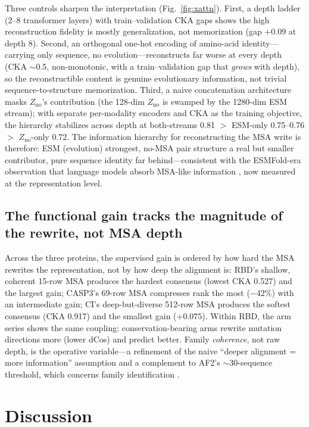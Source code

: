 \documentclass[11pt]{article}
\newcommand{\Zno}{\ensuremath{Z_{\mathrm{no}}}}
\begin{document}
Three controls sharpen the interpretation (Fig.~\ref{fig:xattn}). First, a
depth ladder (2--8 transformer layers) with train--validation CKA gaps shows
the high reconstruction fidelity is mostly generalization, not memorization
(gap $+0.09$ at depth 8). Second, an orthogonal one-hot encoding of amino-acid
identity---carrying only sequence, no evolution---reconstructs far worse at
every depth (CKA $\sim$0.5, non-monotonic, with a train--validation gap that
\emph{grows} with depth), so the reconstructible content is genuine
evolutionary information, not trivial sequence-to-structure memorization.
Third, a naive concatenation architecture masks \Zno{}'s contribution (the
128-dim \Zno{} is swamped by the 1280-dim ESM stream); with separate
per-modality encoders and CKA as the training objective, the hierarchy
stabilizes across depth at both-streams 0.81 $>$ ESM-only 0.75--0.76 $>$
\Zno{}-only 0.72. The information hierarchy for reconstructing the MSA write
is therefore: ESM (evolution) strongest, no-MSA pair structure a real but
smaller contributor, pure sequence identity far behind---consistent with the
ESMFold-era observation that language models absorb MSA-like information
\cite{lin2022}, now measured at the representation level.

\subsection{The functional gain tracks the magnitude of the rewrite, not MSA depth}
\label{sec:law}

Across the three proteins, the supervised gain is ordered by how hard the MSA
rewrites the representation, not by how deep the alignment is: RBD's shallow,
coherent 15-row MSA produces the hardest consensus (lowest CKA 0.527) and the
largest gain; CASP3's 69-row MSA compresses rank the most ($-42\%$) with an
intermediate gain; CI's deep-but-diverse 512-row MSA produces the softest
consensus (CKA 0.917) and the smallest gain ($+0.075$). Within RBD, the arm
series shows the same coupling: conservation-bearing arms rewrite mutation
directions more (lower dCos) and predict better. Family \emph{coherence}, not
raw depth, is the operative variable---a refinement of the naive
``deeper alignment = more information'' assumption and a complement to AF2's
$\sim$30-sequence threshold, which concerns family identification
\cite{jumper2021}.

\section{Discussion}
\end{document}
